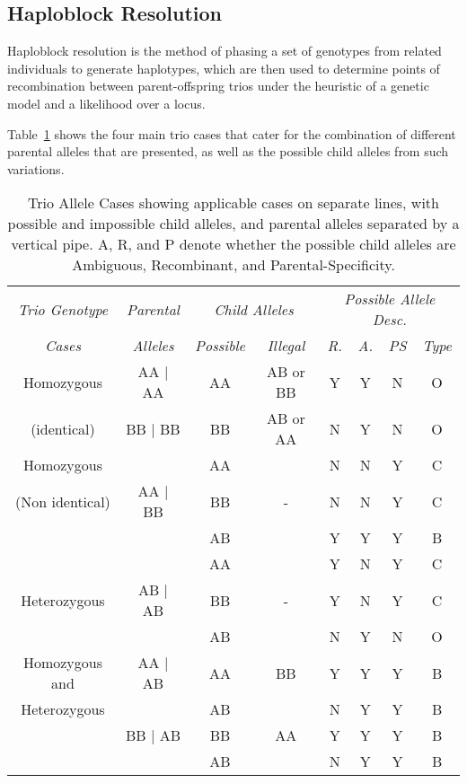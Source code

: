 \subsection{Haploblock Resolution}

Haploblock resolution is the method of phasing a set of genotypes from related individuals to generate haplotypes, which are then used to determine points of recombination between parent-offspring trios under the heuristic of a genetic model and a likelihood over a locus.

Table~\ref{table:haplo:trioalleles} shows the four main trio cases that cater for the combination of different parental alleles that are presented, as well as the possible child alleles from such variations.


\begin{table}[h]
\begin{center}
\begin{tabular}{ *8c } \toprule
\emph{Trio Genotype} & \emph{Parental} & \multicolumn{2}{c}{\emph{Child Alleles}} & \multicolumn{4}{c}{\emph{Possible Allele Desc.}} \\
\emph{Cases} & \emph{Alleles} & \emph{Possible} & \emph{Illegal} & \emph{R.} & \emph{A.} & \emph{PS} & \emph{Type} \\
\midrule
Homozygous  & AA | AA & AA & AB or BB & Y & Y & N & O \\
(identical) & BB | BB & BB & AB or AA & N & Y & N & O \\
\hline
Homozygous      &         & AA &    & N & N & Y & C\\
(Non identical) & AA | BB & BB & -  & N & N & Y & C\\
                &         & AB &    & Y & Y & Y & B\\
\hline
                &         & AA &    & Y & N & Y & C\\
Heterozygous    & AB | AB & BB & -  & Y & N & Y & C\\
                &         & AB &    & N & Y & N & O\\
\hline
Homozygous and  & AA | AB & AA & BB & Y & Y & Y & B\\
Heterozygous    &         & AB &    & N & Y & Y & B\\
                & BB | AB & BB & AA & Y & Y & Y & B\\
                &         & AB &    & N & Y & Y & B\\
\hline
\end{tabular}
\end{center}
\caption[Trio Allele Cases]{Trio Allele Cases showing applicable cases on separate lines, with possible and impossible child alleles, and parental alleles separated by a vertical pipe. A, R, and P denote whether the possible child alleles are Ambiguous, Recombinant, and Parental-Specificity.}\label{table:haplo:trioalleles}
\end{table}

